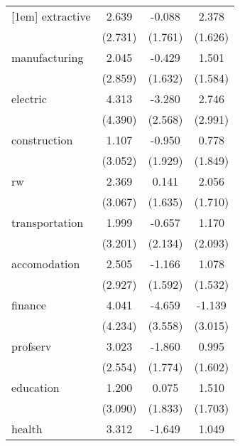 {\begin{tabular}{l*{3}{c}}
[1em]
extractive  &       2.639         &      -0.088         &       2.378         \\
            &     (2.731)         &     (1.761)         &     (1.626)         \\
[1em]
manufacturing&       2.045         &      -0.429         &       1.501         \\
            &     (2.859)         &     (1.632)         &     (1.584)         \\
[1em]
electric    &       4.313         &      -3.280         &       2.746         \\
            &     (4.390)         &     (2.568)         &     (2.991)         \\
[1em]
construction&       1.107         &      -0.950         &       0.778         \\
            &     (3.052)         &     (1.929)         &     (1.849)         \\
[1em]
rw          &       2.369         &       0.141         &       2.056         \\
            &     (3.067)         &     (1.635)         &     (1.710)         \\
[1em]
transportation&       1.999         &      -0.657         &       1.170         \\
            &     (3.201)         &     (2.134)         &     (2.093)         \\
[1em]
accomodation&       2.505         &      -1.166         &       1.078         \\
            &     (2.927)         &     (1.592)         &     (1.532)         \\
[1em]
finance     &       4.041         &      -4.659         &      -1.139         \\
            &     (4.234)         &     (3.558)         &     (3.015)         \\
[1em]
profserv    &       3.023         &      -1.860         &       0.995         \\
            &     (2.554)         &     (1.774)         &     (1.602)         \\
[1em]
education   &       1.200         &       0.075         &       1.510         \\
            &     (3.090)         &     (1.833)         &     (1.703)         \\
[1em]
health      &       3.312         &      -1.649         &       1.049         \\

\end{tabular}}

